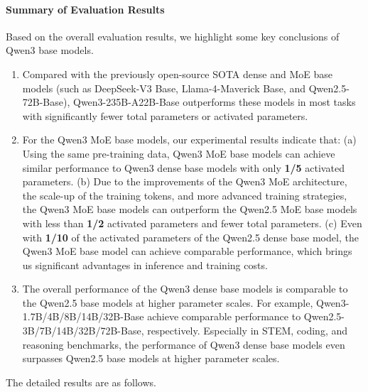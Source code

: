 \paragraph{Summary of Evaluation Results}
Based on the overall evaluation results, we highlight some key conclusions of Qwen3 base models. 
\begin{enumerate}[label=(\arabic*)]
\item Compared with the previously open-source SOTA dense and MoE base models (such as DeepSeek-V3 Base, Llama-4-Maverick Base, and Qwen2.5-72B-Base), Qwen3-235B-A22B-Base outperforms these models in most tasks with significantly fewer total parameters or activated parameters.

\item For the Qwen3 MoE base models, our experimental results indicate that: (a) Using the same pre-training data, Qwen3 MoE base models can achieve similar performance to Qwen3 dense base models with only \textbf{1/5} activated parameters. (b) Due to the improvements of the Qwen3 MoE architecture, the scale-up of the training tokens, and more advanced training strategies, the Qwen3 MoE base models can outperform the Qwen2.5 MoE base models with less than \textbf{1/2} activated parameters and fewer total parameters. (c) Even with \textbf{1/10} of the activated parameters of the Qwen2.5 dense base model, the Qwen3 MoE base model can achieve comparable performance, which brings us significant advantages in inference and training costs.

\item The overall performance of the Qwen3 dense base models is comparable to the Qwen2.5 base models at higher parameter scales. For example, Qwen3-1.7B/4B/8B/14B/32B-Base achieve comparable performance to Qwen2.5-3B/7B/14B/32B/72B-Base, respectively. Especially in STEM, coding, and reasoning benchmarks, the performance of Qwen3 dense base models even surpasses Qwen2.5 base models at higher parameter scales.
\end{enumerate}
The detailed results are as follows.

